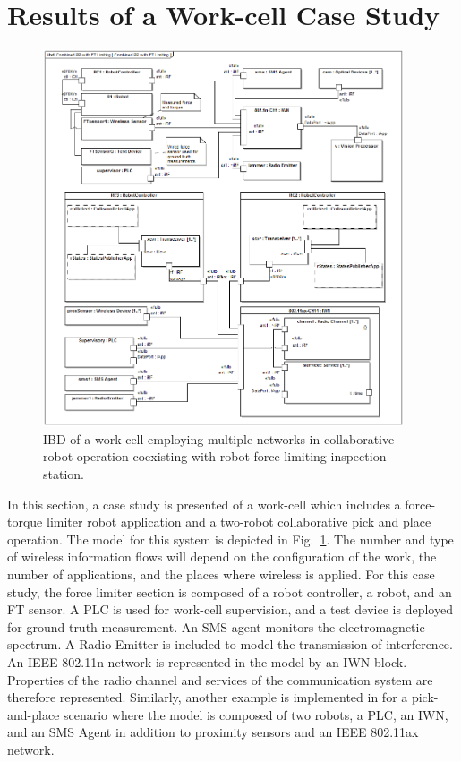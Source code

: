 \section{Results of a Work-cell Case Study}\label{sysml:sec:wireless-infoflows}
\begin{figure}[tbp]
	\centering
	\includegraphics[width=0.95\textwidth]{./chapter-sysml/diagrams/ibd__Combined_PP_with_FT_Limiting__Combined_PP_with_FT_Limiting}
	\caption{IBD of a work-cell employing multiple networks in collaborative robot operation coexisting with robot force limiting inspection station.}
	\label{sysml:fig:workcell:examples}     
\end{figure}

In this section, a case study is presented of a work-cell which includes a force-torque limiter robot application and a two-robot collaborative pick and place operation.  The model for this system is depicted in Fig.~\ref{sysml:fig:workcell:examples}.  The number and type of wireless information flows will depend on the configuration of the work, the number of applications, and the places where wireless is applied. For this case study, the force limiter section is composed of a robot controller, a robot, and an FT sensor. A PLC is used for work-cell supervision, and a test device is deployed for ground truth measurement.  An SMS agent monitors the electromagnetic spectrum.  A Radio Emitter is included to model the transmission of interference.  An IEEE 802.11n network is represented in the model by an IWN block. Properties of the radio channel and services of the communication system are therefore represented. Similarly, another example is implemented in \cite{SysML.Candell2018} for a pick-and-place scenario where the model is composed of two robots, a PLC, an IWN, and an SMS Agent in addition to proximity sensors and an IEEE 802.11ax network.

